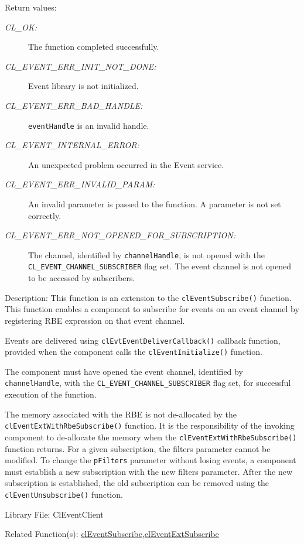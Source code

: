 \begin{flushleft}
\begin{Desc}
\begin{description}
\end{description}
\end{Desc}
\begin{Desc}
\item[Return values:]
\begin{description}
\item[{\em CL\_\-OK:}]The function completed successfully. 
\item[{\em CL\_\-EVENT\_\-ERR\_\-INIT\_\-NOT\_\-DONE:}]Event library is not initialized. 
\item[{\em CL\_\-EVENT\_\-ERR\_\-BAD\_\-HANDLE:}]{\tt{eventHandle}} is an invalid handle.
\item[{\em CL\_\-EVENT\_\-INTERNAL\_\-ERROR:}]An unexpected problem occurred in the Event service. 
\item[{\em CL\_\-EVENT\_\-ERR\_\-INVALID\_\-PARAM:}]An invalid parameter is passed to the function. A parameter is not set correctly.
\item[{\em CL\_\-EVENT\_\-ERR\_\-NOT\_\-OPENED\_\-FOR\_\-SUBSCRIPTION:}]The channel, identified by {\tt{channelHandle}}, is not opened with the
{\tt{CL\_\-EVENT\_\-CHANNEL\_\-SUBSCRIBER}} flag set. The event channel is not opened to be accessed by subscribers.
\end{description}
\end{Desc}
\begin{Desc}
\item[Description:]
This function is an extension to the {\tt{clEventSubscribe()}} function. This function enables a component to subscribe for events on an event channel by 
registering RBE expression on that event channel.
\par
Events are delivered using {\tt{clEvtEventDeliverCallback()}} callback function, provided when the 
component calls the {\tt{clEventInitialize()}} function.
\par
The component must have opened the event channel, identified by {\tt{channelHandle}}, with the {\tt{CL\_\-EVENT\_\-CHANNEL\_\-SUBSCRIBER}} flag set, for 
successful execution of the function.
\par
The memory associated with the RBE is not de-allocated by the {\tt{clEventExtWithRbeSubscribe()}} function. It is the responsibility of the invoking 
component to de-allocate the memory when the {\tt{clEventExtWithRbeSubscribe()}} function returns. For a given subscription, the filters parameter cannot be 
modified. To change the {\tt{pFilters}} parameter without losing events, a component must establish a new subscription with the new filters parameter. 
After the new subscription is established, the old subscription can be removed using the {\tt{clEventUnsubscribe()}} function. 
\end{Desc}
\begin{Desc}
\item[Library File:]Cl\-Event\-Client\end{Desc}
\begin{Desc}
\item[Related Function(s):]\hyperlink{pageem114}{cl\-Event\-Subscribe},\hyperlink{pageem201}{cl\-Event\-Ext\-Subscribe} \end{Desc}
\newpage



\end{flushleft}
